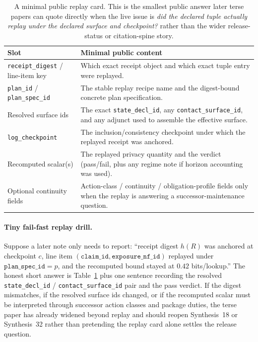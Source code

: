 \documentclass[11pt]{article}
\begin{document}
\begin{table}[t]
\centering\small
\begin{tabularx}{\linewidth}{@{}lX@{}}
\toprule
Slot & Minimal public content \\ 
\midrule
\texttt{receipt\_digest} / line-item key & Which exact receipt object and which exact tuple entry were replayed. \\ 
\texttt{plan\_id} / \texttt{plan\_spec\_id} & The stable replay recipe name and the digest-bound concrete plan specification. \\ 
Resolved surface ids & The exact \texttt{state\_decl\_id}, any \texttt{contact\_surface\_id}, and any adjunct used to assemble the effective surface. \\ 
\texttt{log\_checkpoint} & The inclusion/consistency checkpoint under which the replayed receipt was anchored. \\ 
Recomputed scalar(s) & The replayed privacy quantity and the verdict (pass/fail, plus any regime note if horizon accounting was used). \\ 
Optional continuity fields & Action-class / continuity / obligation-profile fields only when the replay is answering a successor-maintenance question. \\ 
\bottomrule
\end{tabularx}
\caption{A minimal public replay card. This is the smallest public answer later terse papers can quote directly when the live issue is \emph{did the declared tuple actually replay under the declared surface and checkpoint?} rather than the wider release-status or citation-spine story.}
\label{tab:minreplaycard}
\end{table}

\paragraph{Tiny fail-fast replay drill.}
Suppose a later note only needs to report: ``receipt digest $h(R)$ was anchored at checkpoint $c$, line item $(\texttt{claim\_id},\texttt{exposure\_nf\_id})$ replayed under $\texttt{plan\_spec\_id}=p$, and the recomputed bound stayed at $0.42$ bits/lookup.'' The honest short answer is Table~\ref{tab:minreplaycard} plus one sentence recording the resolved \texttt{state\_decl\_id} / \texttt{contact\_surface\_id} pair and the pass verdict. If the digest mismatches, if the resolved surface ids changed, or if the recomputed scalar must be interpreted through successor action classes and package duties, the terse paper has already widened beyond replay and should reopen Synthesis~18 or Synthesis~32 rather than pretending the replay card alone settles the release question.\cite{series:planstateequiv,series:deployedsurfaces,series:releasespine}
\end{document}
